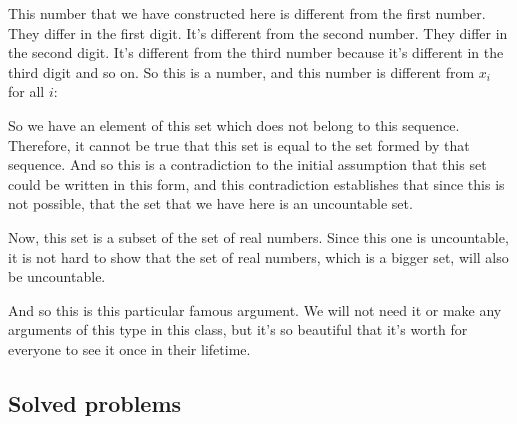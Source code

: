 \documentclass[pdftex, brazil, 12pt, twoside]{article}
\begin{document}
This number that we have constructed here is different
from the first number.
They differ in the first digit.
It's different from the second number.
They differ in the second digit.
It's different from the third number because it's different
in the third digit and so on.
So this is a number, and this number is different
from $x_i$ for all $i$:

\begin{figure}[H]
  \begin{center}
  \end{center}
\end{figure}

So we have an element of this set which does not belong to
this sequence.
Therefore, it cannot be true that this set is equal to the
set formed by that sequence.
And so this is a contradiction to the initial assumption that
this set could be written in this form, and this
contradiction establishes that since this is not possible,
that the set that we have here is an uncountable set.

Now, this set is a subset of the set of real numbers.
Since this one is uncountable, it is not hard to show that
the set of real numbers, which is a bigger set, will also be
uncountable.

And so this is this particular famous argument.
We will not need it or make any arguments of this type in
this class, but it's so beautiful that it's worth for
everyone to see it once in their lifetime.


\subsection{Solved problems}
\label{un1-solved-problems}
\end{document}
